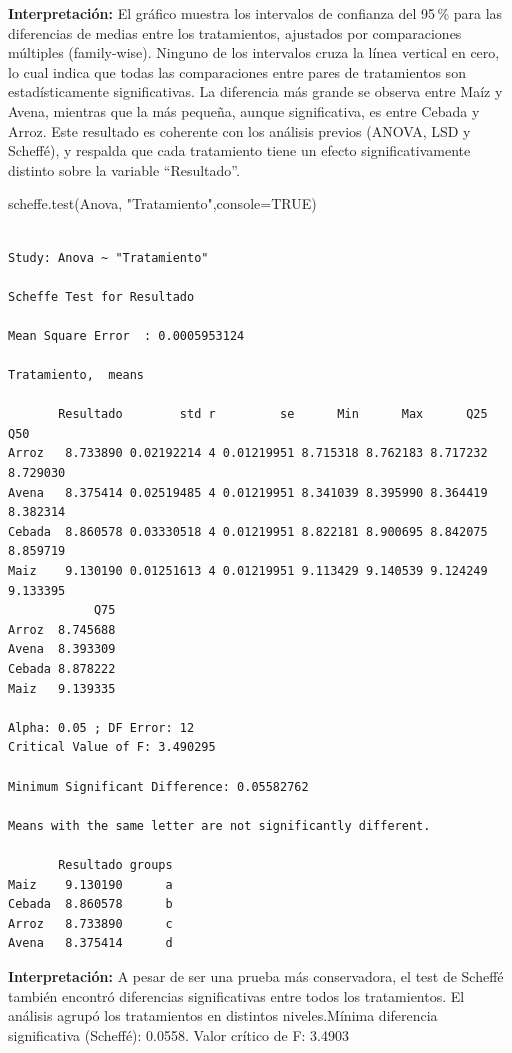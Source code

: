 \documentclass[
  spanish,
  letterpaper,
  DIV=11,
  numbers=noendperiod]{scrreprt}
\newenvironment{Shaded}{\begin{snugshade}}{\end{snugshade}}
\newcommand{\AttributeTok}[1]{\textcolor[rgb]{0.40,0.45,0.13}{#1}}
\newcommand{\ConstantTok}[1]{\textcolor[rgb]{0.56,0.35,0.01}{#1}}
\newcommand{\FunctionTok}[1]{\textcolor[rgb]{0.28,0.35,0.67}{#1}}
\newcommand{\NormalTok}[1]{\textcolor[rgb]{0.00,0.23,0.31}{#1}}
\newcommand{\StringTok}[1]{\textcolor[rgb]{0.13,0.47,0.30}{#1}}
\begin{document}
\textbf{Interpretación:} El gráfico muestra los intervalos de confianza
del 95\,\% para las diferencias de medias entre los tratamientos,
ajustados por comparaciones múltiples (family-wise). Ninguno de los
intervalos cruza la línea vertical en cero, lo cual indica que todas las
comparaciones entre pares de tratamientos son estadísticamente
significativas. La diferencia más grande se observa entre Maíz y Avena,
mientras que la más pequeña, aunque significativa, es entre Cebada y
Arroz. Este resultado es coherente con los análisis previos (ANOVA, LSD
y Scheffé), y respalda que cada tratamiento tiene un efecto
significativamente distinto sobre la variable ``Resultado''.

\begin{Shaded}
\begin{Highlighting}[]
\FunctionTok{scheffe.test}\NormalTok{(Anova, }\StringTok{"Tratamiento"}\NormalTok{,}\AttributeTok{console=}\ConstantTok{TRUE}\NormalTok{)}
\end{Highlighting}
\end{Shaded}

\begin{verbatim}

Study: Anova ~ "Tratamiento"

Scheffe Test for Resultado 

Mean Square Error  : 0.0005953124 

Tratamiento,  means

       Resultado        std r         se      Min      Max      Q25      Q50
Arroz   8.733890 0.02192214 4 0.01219951 8.715318 8.762183 8.717232 8.729030
Avena   8.375414 0.02519485 4 0.01219951 8.341039 8.395990 8.364419 8.382314
Cebada  8.860578 0.03330518 4 0.01219951 8.822181 8.900695 8.842075 8.859719
Maiz    9.130190 0.01251613 4 0.01219951 9.113429 9.140539 9.124249 9.133395
            Q75
Arroz  8.745688
Avena  8.393309
Cebada 8.878222
Maiz   9.139335

Alpha: 0.05 ; DF Error: 12 
Critical Value of F: 3.490295 

Minimum Significant Difference: 0.05582762 

Means with the same letter are not significantly different.

       Resultado groups
Maiz    9.130190      a
Cebada  8.860578      b
Arroz   8.733890      c
Avena   8.375414      d
\end{verbatim}

\textbf{Interpretación:} A pesar de ser una prueba más conservadora, el
test de Scheffé también encontró diferencias significativas entre todos
los tratamientos. El análisis agrupó los tratamientos en distintos
niveles.Mínima diferencia significativa (Scheffé): 0.0558. Valor crítico
de F: 3.4903
\end{document}
